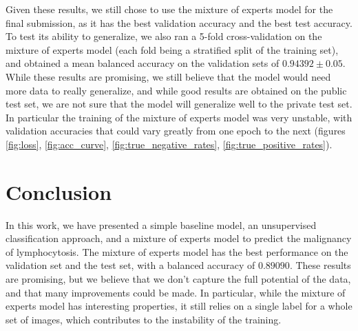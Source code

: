 \documentclass{midl}
\begin{document}
\begin{table}[H]
    \begin{center}
    \end{center}
    \vspace*{-\baselineskip}
    \caption{Main balanced accuracy results}
    \label{tab:results}
\end{table}

Given these results, we still chose to use the mixture of experts model for the final submission, as it has the best validation accuracy and the best test accuracy. To test its ability to generalize, we also ran a 5-fold cross-validation on the mixture of experts model (each fold being a stratified split of the training set), and obtained a mean balanced accuracy on the validation sets of $0.94392\pm 0.05$. While these results are promising, we still believe that the model would need more data to really generalize, and while good results are obtained on the public test set, we are not sure that the model will generalize well to the private test set. In particular the training of the mixture of experts model was very unstable, with validation accuracies that could vary greatly from one epoch to the next (figures \ref{fig:loss}, \ref{fig:acc_curve}, \ref{fig:true_negative_rates}, \ref{fig:true_positive_rates}).

\section{Conclusion}

In this work, we have presented a simple baseline model, an unsupervised classification approach, and a mixture of experts model to predict the malignancy of lymphocytosis. The mixture of experts model has the best performance on the validation set and the test set, with a balanced accuracy of $0.89090$. These results are promising, but we believe that we don't capture the full potential of the data, and that many improvements could be made. In particular, while the mixture of experts model has interesting properties, it still relies on a single label for a whole set of images, which contributes to the instability of the training.
\end{document}
